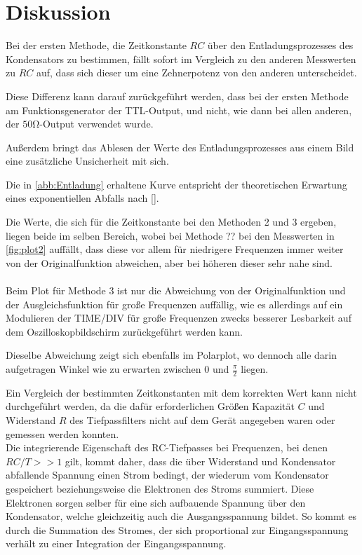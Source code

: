 \section{Diskussion}
\label{sec:Diskussion}
Bei der ersten Methode, die Zeitkonstante $RC$ über den Entladungsprozesses des Kondensators zu bestimmen, fällt sofort im Vergleich zu
den anderen Messwerten zu $RC$ auf, dass sich dieser um eine Zehnerpotenz von den anderen unterscheidet. 

Diese Differenz kann darauf zurückgeführt werden, dass bei der ersten Methode am Funktionsgenerator der TTL-Output, und nicht, wie dann bei allen anderen, der $50\unit{\ohm}$-Output verwendet wurde. 

Außerdem bringt das Ablesen der Werte des Entladungsprozesses aus einem Bild eine zusätzliche Unsicherheit mit sich.

Die in \autoref{abb:Entladung} erhaltene Kurve entspricht der theoretischen Erwartung eines exponentiellen Abfalls nach \eqref{}.

Die Werte, die sich für die Zeitkonstante bei den Methoden 2 und 3 ergeben, liegen beide im selben Bereich, wobei bei Methode ?? bei den Messwerten
in \autoref{fig:plot2} auffällt, dass diese vor allem für niedrigere Frequenzen immer weiter von der Originalfunktion abweichen, aber bei höheren dieser sehr nahe sind.\\
\\
Beim Plot für Methode 3 ist nur die Abweichung von der Originalfunktion und der Ausgleichsfunktion für große Frequenzen auffällig, wie es allerdings auf ein Modulieren der TIME/DIV
für große Frequenzen zwecks besserer Lesbarkeit auf dem Oszilloskopbildschirm zurückgeführt werden kann. 

Dieselbe Abweichung zeigt sich ebenfalls im Polarplot, wo dennoch alle
darin aufgetragen Winkel wie zu erwarten zwischen $0$ und $\frac{\pi}{2}$ liegen.

Ein Vergleich der bestimmten Zeitkonstanten mit dem korrekten Wert kann nicht durchgeführt werden, da die dafür erforderlichen Größen Kapazität $C$ und Widerstand $R$ des Tiefpassfilters
 nicht auf dem Gerät angegeben waren oder gemessen werden konnten.\\

Die integrierende Eigenschaft des RC-Tiefpasses bei Frequenzen, bei denen $RC/T >> 1$ gilt, kommt daher, dass 
die über Widerstand und Kondensator abfallende Spannung einen Strom bedingt, der wiederum vom Kondensator gespeichert
beziehungsweise die Elektronen des Stroms summiert. Diese Elektronen sorgen selber für eine sich aufbauende Spannung
über den Kondensator, welche gleichzeitig auch die Ausgangsspannung bildet. So kommt es durch die Summation des
Stromes, der sich proportional zur Eingangsspannung verhält zu einer Integration der Eingangsspannung.